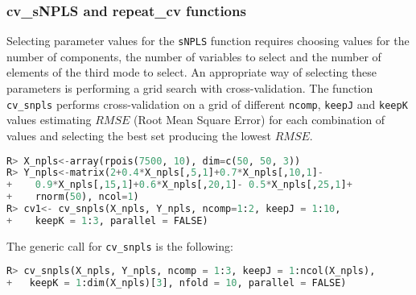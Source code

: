 \subsubsection{cv\_sNPLS and repeat\_cv functions}
Selecting parameter values for the \texttt{sNPLS} function requires choosing values for the number of components, the number of variables to select and the number of elements of the third mode to select. An appropriate way of selecting these parameters is performing a grid search with cross-validation. The function \texttt{cv\_snpls} performs cross-validation on a grid of different \texttt{ncomp}, \texttt{keepJ} and \texttt{keepK} values estimating $RMSE$ (Root Mean Square Error) for each combination of values and selecting the best set producing the lowest $RMSE$.

\vspace{15pt}
\begin{lstlisting}[basicstyle=\small, language=Python]
R> X_npls<-array(rpois(7500, 10), dim=c(50, 50, 3))
R> Y_npls<-matrix(2+0.4*X_npls[,5,1]+0.7*X_npls[,10,1]-
+    0.9*X_npls[,15,1]+0.6*X_npls[,20,1]- 0.5*X_npls[,25,1]+
+    rnorm(50), ncol=1)
R> cv1<- cv_snpls(X_npls, Y_npls, ncomp=1:2, keepJ = 1:10, 
+    keepK = 1:3, parallel = FALSE)
\end{lstlisting}

The generic call for \texttt{cv\_snpls} is the following:
\vspace{15pt}
\begin{lstlisting}[basicstyle=\small, language=Python]
R> cv_snpls(X_npls, Y_npls, ncomp = 1:3, keepJ = 1:ncol(X_npls),
+   keepK = 1:dim(X_npls)[3], nfold = 10, parallel = FALSE)
\end{lstlisting}

